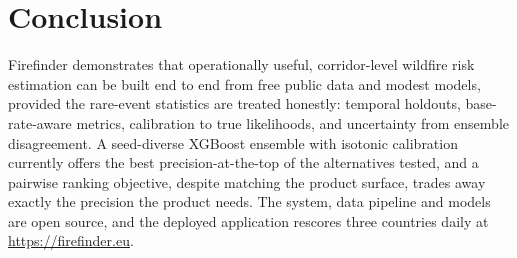 \documentclass[11pt]{article}
\begin{document}
\section{Conclusion}

Firefinder demonstrates that operationally useful, corridor-level wildfire
risk estimation can be built end to end from free public data and modest
models, provided the rare-event statistics are treated honestly: temporal
holdouts, base-rate-aware metrics, calibration to true likelihoods, and
uncertainty from ensemble disagreement. A seed-diverse XGBoost ensemble with
isotonic calibration currently offers the best precision-at-the-top of the
alternatives tested, and a pairwise ranking objective, despite matching the
product surface, trades away exactly the precision the product needs. The
system, data pipeline and models are open source, and the deployed
application rescores three countries daily at
\url{https://firefinder.eu}.
\end{document}
